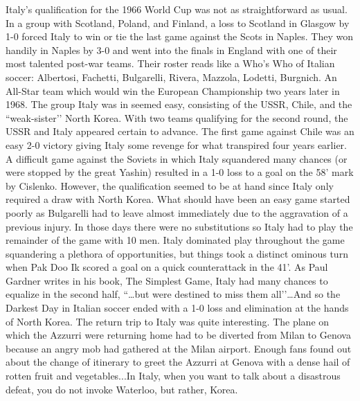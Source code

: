 Italy's qualification for the 1966 World Cup was not as straightforward as 
usual. In a group with Scotland, Poland, and Finland, a loss to Scotland in 
Glasgow by 1-0 forced Italy to win or tie the last game against the Scots in 
Naples. They won handily in Naples by 3-0 and went into the finals in England 
with one of their most talented post-war teams. Their roster reads like a Who's
Who of Italian soccer: Albertosi, Fachetti, Bulgarelli, Rivera, Mazzola, 
Lodetti, Burgnich.  An All-Star team which would win the European Championship 
two years later in 1968. The group Italy was in seemed easy, consisting of the 
USSR, Chile, and the ``weak-sister’’ North Korea.  With two teams qualifying for 
the second round, the USSR and Italy appeared certain to advance. The first 
game against Chile was an easy 2-0 victory giving Italy some revenge for what 
transpired four years earlier. A difficult game against the Soviets in which 
Italy squandered many chances (or were stopped by the great Yashin) resulted in
a 1-0 loss to a goal on the 58' mark by Cislenko. However, the qualification 
seemed to be at hand since Italy only required a draw with North Korea. What 
should have been an easy game started poorly as Bulgarelli had to leave almost 
immediately due to the aggravation of a previous injury. In those days there 
were no substitutions so Italy had to play the remainder of the game with 10 
men. Italy dominated play throughout the game squandering a plethora of 
opportunities, but things took a distinct ominous turn when Pak Doo Ik scored a
goal on a quick counterattack in the 41'. As Paul Gardner writes in his book, 
The Simplest Game, Italy had many chances to equalize in the second half, 
``…but were destined to miss them all’’…And so the Darkest Day in Italian 
soccer ended with a 1-0 loss and elimination at the hands of North Korea. The 
return trip to Italy was quite interesting. The plane on which the Azzurri were
returning home had to be diverted from Milan to Genova because an angry mob had
gathered at the Milan airport. Enough fans found out about the change of 
itinerary to greet the Azzurri at Genova with a dense hail of rotten fruit and 
vegetables...In Italy, when you want to talk about a disastrous defeat, you do 
not invoke Waterloo, but rather, Korea.

